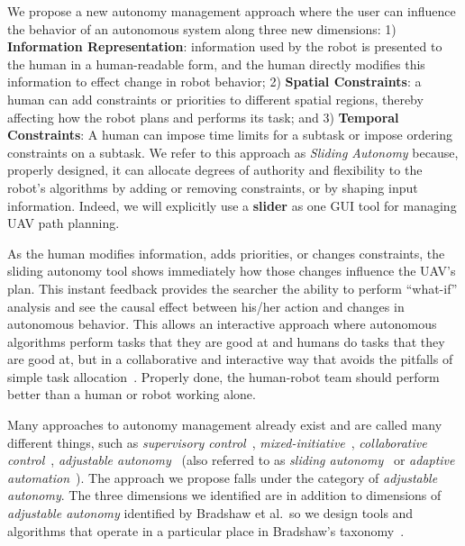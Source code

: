We propose a new autonomy management approach where the user can influence the behavior of an autonomous system along three new dimensions: 1) \textbf{Information Representation}: information used by the robot is presented to the human in a human-readable form, and the human directly modifies this information to effect change in robot behavior; 2) \textbf{Spatial Constraints}: a human can add constraints or priorities to different spatial regions, thereby affecting how the robot plans and performs its task; and 3) \textbf{Temporal Constraints}: A human can impose time limits for a subtask or impose ordering constraints on a subtask. We refer to this approach as \textit{Sliding Autonomy} because, properly designed, it can allocate degrees of authority and flexibility to the robot's algorithms by adding or removing constraints, or by shaping input information. Indeed, we will explicitly use a \textbf{slider} as one GUI tool for managing UAV path planning. \

As the human modifies information, adds priorities, or changes constraints, the sliding autonomy tool shows immediately how those changes influence the UAV's plan. This instant feedback provides the searcher the ability to perform ``what-if'' analysis and see the causal effect between his/her action and changes in autonomous behavior. This allows an interactive approach where autonomous algorithms perform tasks that they are good at and humans do tasks that they are good at, but in a collaborative and interactive way that avoids the pitfalls of simple task allocation~\cite{Sheridan1992Telerobotics}. Properly done, the human-robot team should perform better than a human or robot working alone. 

Many approaches to autonomy management already exist and are called many different things, such as \textit{supervisory control}~\cite{Sheridan1992Telerobotics}, \textit{mixed-initiative}~\cite{Hearst1999Mixed}, \textit{collaborative control}~\cite{Fong1999Collaborative}, \textit{adjustable autonomy}~\cite{Dorais1998AdjustableAutonomy,Dorais2001Designing} (also referred to as \textit{sliding autonomy}~\cite{Dias2008SlidingAutonomy} or \textit{adaptive automation}~\cite{Rouse1988Adaptive,Kaber2001Design}). The approach we propose falls under the category of \textit{adjustable autonomy}. The three dimensions we identified are in addition to dimensions of \textit{adjustable autonomy} identified by Bradshaw et al.\, so we design tools and algorithms that operate in a particular place in Bradshaw's taxonomy~\cite{Bradshaw2004Dimensions}.

